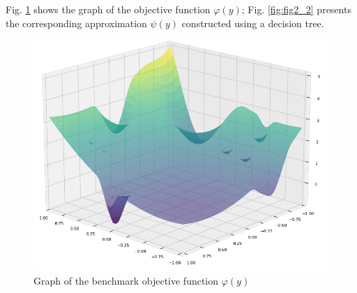 \documentclass[runningheads]{llncs}
\begin{document}
Fig. \ref{fig:fig2} shows the graph of the objective function $\varphi(y)$; Fig. \ref{fig:fig2_2} presents the corresponding approximation $\psi(y)$ constructed using a decision tree.
\begin{figure}
	\begin{center}
		\begin{minipage}[h]{0.7\linewidth}
			\includegraphics[width=1\linewidth]{figure/fig5.png}
			\caption{Graph of the benchmark objective function $\varphi(y)$} %
			\label{fig:fig2}
		\end{minipage}
	\end{center}
\end{figure}	
\end{document}
